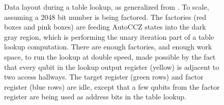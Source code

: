 \documentclass[superscriptaddress,notitlepage,longbibliography]{revtex4-1}
\theoremstyle{definition}
\theoremstyle{definition}
\begin{document}
\begin{figure}[p]
    \label{fig:addition-layout-2d}
\end{figure}

\begin{figure}[p]
    \label{fig:lookup-layout}
    \caption{
        Data layout during a table lookup, as generalized from \cite{gidney2019autoccz}.
        To scale, assuming a 2048 bit number is being factored.
        The factories (red boxes and pink boxes) are feeding AutoCCZ states into the dark gray region, which is performing the unary iteration part of a table lookup computation.
        There are enough factories, and enough work space, to run the lookup at double speed, made possible by the fact that every qubit in the lookup output register (yellow) is adjacent to two access hallways.
        The target register (green rows) and factor register (blue rows) are idle, except that a few qubits from the factor register are being used as address bits in the table lookup.
    }
\end{figure}
\end{document}
